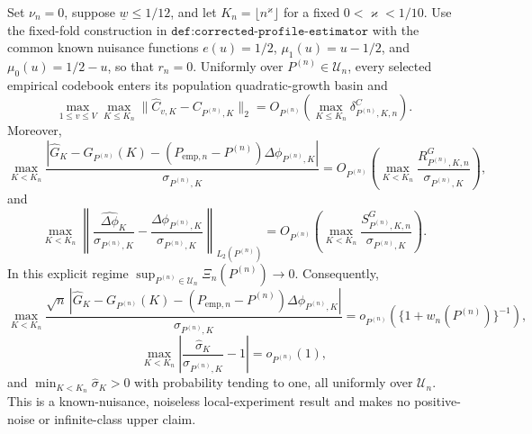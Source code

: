 Set \(\nu_n=0\), suppose \(\underline w\leq1/12\), and let \(K_n=\lfloor n^\varkappa\rfloor\) for a fixed \(0<\varkappa<1/10\).  Use the fixed-fold construction in \(\texttt{def:corrected-profile-estimator}\) with the common known nuisance functions \(e(u)=1/2\), \(\mu_1(u)=u-1/2\), and \(\mu_0(u)=1/2-u\), so that \(r_n=0\).  Uniformly over \(P^{(n)}\in\mathcal U_n\), every selected empirical codebook enters its population quadratic-growth basin and
\[
 \max_{1\leq v\leq V}\max_{K\leq K_n}\|\widehat C_{v,K}-C_{P^{(n)},K}\|_2
 =O_{P^{(n)}}\!\left(\max_{K\leq K_n}\delta^C_{P^{(n)},K,n}\right).
\]
Moreover,
\[
 \max_{K<K_n}\frac{|\widehat G_K-G_{P^{(n)}}(K)-(P_{\mathrm{emp},n}-P^{(n)})\Delta\phi_{P^{(n)},K}|}{\sigma_{P^{(n)},K}}
 =O_{P^{(n)}}\!\left(\max_{K<K_n}\frac{R^G_{P^{(n)},K,n}}{\sigma_{P^{(n)},K}}\right),
\]
and
\[
 \max_{K<K_n}\left\|
 \frac{\widehat{\Delta\phi}_{K}}{\sigma_{P^{(n)},K}}-
 \frac{\Delta\phi_{P^{(n)},K}}{\sigma_{P^{(n)},K}}
 \right\|_{L_2(P^{(n)})}
 =O_{P^{(n)}}\!\left(\max_{K<K_n}\frac{S^G_{P^{(n)},K,n}}{\sigma_{P^{(n)},K}}\right).
\]
In this explicit regime \(\sup_{P^{(n)}\in\mathcal U_n}\Xi_n(P^{(n)})\to0\).  Consequently,
\[
 \max_{K<K_n}\frac{\sqrt n\,|\widehat G_K-G_{P^{(n)}}(K)-(P_{\mathrm{emp},n}-P^{(n)})\Delta\phi_{P^{(n)},K}|}{\sigma_{P^{(n)},K}}
 =o_{P^{(n)}}\!\left(\{1+w_n(P^{(n)})\}^{-1}\right),
\]
\[
 \max_{K<K_n}\left|\frac{\widehat\sigma_K}{\sigma_{P^{(n)},K}}-1\right|=o_{P^{(n)}}(1),
\]
and \(\min_{K<K_n}\widehat\sigma_K>0\) with probability tending to one, all uniformly over \(\mathcal U_n\).  This is a known-nuisance, noiseless local-experiment result and makes no positive-noise or infinite-class upper claim.
